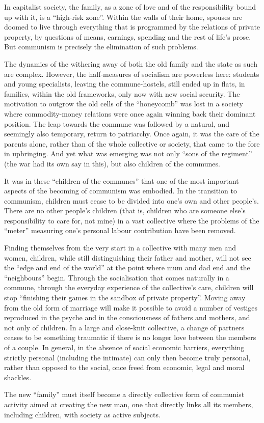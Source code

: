 \documentclass[../main]{subfiles}
\begin{document}
In capitalist society, the family, as a zone of love and of the responsibility bound up with it, is a “high-risk zone”. Within the walls of their home, spouses are doomed to live through everything that is programmed by the relations of private property, by questions of means, earnings, spending and the rest of life’s prose. But communism is precisely the elimination of such problems.

The dynamics of the withering away of both the old family and the state as such are complex. However, the half-measures of socialism are powerless here: students and young specialists, leaving the commune-hostels, still ended up in flats, in families, within the old frameworks, only now with new social security. The motivation to outgrow the old cells of the “honeycomb” was lost in a society where commodity-money relations were once again winning back their dominant position. The leap towards the commune was followed by a natural, and seemingly also temporary, return to patriarchy. Once again, it was the care of the parents alone, rather than of the whole collective or society, that came to the fore in upbringing. And yet what was emerging was not only “sons of the regiment” (the war had its own say in this), but also children of the communes.

It was in these “children of the communes” that one of the most important aspects of the becoming of communism was embodied. In the transition to communism, children must cease to be divided into one’s own and other people’s. There are no other people’s children (that is, children who are someone else’s responsibility to care for, not mine) in a vast collective where the problems of the “meter” measuring one’s personal labour contribution have been removed.

Finding themselves from the very start in a collective with many men and women, children, while still distinguishing their father and mother, will not see the “edge and end of the world” at the point where mum and dad end and the “neighbours” begin. Through the socialisation that comes naturally in a commune, through the everyday experience of the collective’s care, children will stop “finishing their games in the sandbox of private property”. Moving away from the old form of marriage will make it possible to avoid a number of vestiges reproduced in the psyche and in the consciousness of fathers and mothers, and not only of children. In a large and close-knit collective, a change of partners ceases to be something traumatic if there is no longer love between the members of a couple. In general, in the absence of social economic barriers, everything strictly personal (including the intimate) can only then become truly personal, rather than opposed to the social, once freed from economic, legal and moral shackles.

The new “family” must itself become a directly collective form of communist activity aimed at creating the new man, one that directly links all its members, including children, with society as active subjects.
\end{document}
